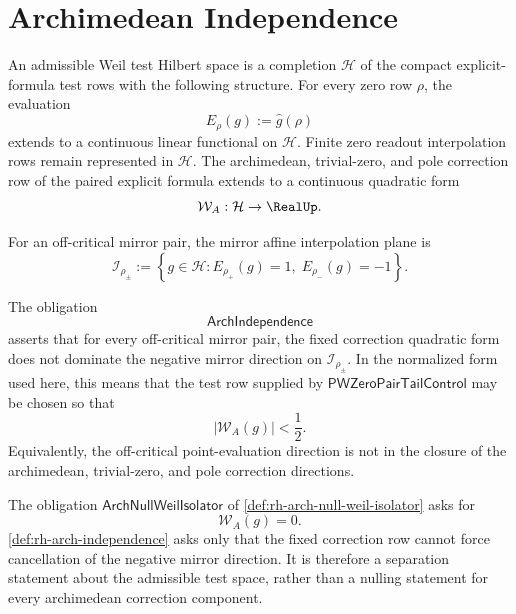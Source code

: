 \section{Archimedean Independence}
\label{sec:rh-negative-weil-archimedean-independence}

\begin{definition}
\label{def:rh-admissible-weil-test-hilbert-space}
An admissible Weil test Hilbert space is a completion $\mathcal H$ of
the compact explicit-formula test rows with the following structure.
For every zero row $\rho$, the evaluation
$$
E_\rho(g):=\widehat g(\rho)
$$
extends to a continuous linear functional on $\mathcal H$.  Finite zero
readout interpolation rows remain represented in $\mathcal H$.  The
archimedean, trivial-zero, and pole correction row of the paired
explicit formula extends to a continuous quadratic form
$$
\mathcal W_A:\mathcal H\to\RealUp.
$$
\end{definition}

\begin{definition}
\label{def:rh-mirror-affine-interpolation-plane}
For an off-critical mirror pair, the mirror affine interpolation plane
is
$$
\mathcal I_{\rho_\pm}
:=
\left\{
g\in\mathcal H:
E_{\rho_+}(g)=1,\;
E_{\rho_-}(g)=-1
\right\}.
$$
\end{definition}

\begin{definition}[ArchIndependence]
\label{def:rh-arch-independence}
The obligation
$$
\mathsf{ArchIndependence}
$$
asserts that for every off-critical mirror pair, the fixed correction
quadratic form does not dominate the negative mirror direction on
$\mathcal I_{\rho_\pm}$.  In the normalized form used here, this means
that the test row supplied by
$\mathsf{PWZeroPairTailControl}$ may be chosen so that
$$
|\mathcal W_A(g)|<\frac12.
$$
Equivalently, the off-critical point-evaluation direction is not in the
closure of the archimedean, trivial-zero, and pole correction directions.
\end{definition}

\begin{principle}
\label{prin:rh-arch-independence-weaker-than-arch-null}
The obligation $\mathsf{ArchNullWeilIsolator}$ of
\autoref{def:rh-arch-null-weil-isolator} asks for
$$
\mathcal W_A(g)=0.
$$
\autoref{def:rh-arch-independence} asks only that the fixed correction
row cannot force cancellation of the negative mirror direction.  It is
therefore a separation statement about the admissible test space, rather
than a nulling statement for every archimedean correction component.
\end{principle}

